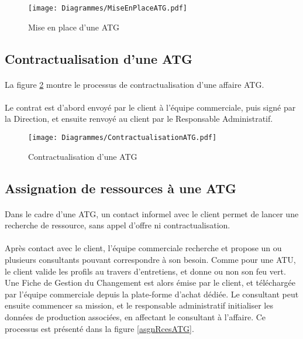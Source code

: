 \begin{figure}[H]
	\centering
	\texttt{[image: Diagrammes/MiseEnPlaceATG.pdf]}
	\caption{Mise en place d'une ATG} 
	\label{miseEnPlaceATG}
\end{figure}


\subsection{Contractualisation d'une ATG}
\label{subsection:contratATG}

\paragraph{} La figure \ref{contratATG} montre le processus de contractualisation d'une affaire ATG.
\paragraph{} Le contrat est d'abord envoyé par le client à l'équipe commerciale, puis signé par la Direction, et ensuite renvoyé au client par le Responsable Administratif. 


\begin{figure}[H]
	\centering
	\texttt{[image: Diagrammes/ContractualisationATG.pdf]}
	\caption{Contractualisation d'une ATG} 
	\label{contratATG}
\end{figure}



\subsection{Assignation de ressources à une ATG}

\paragraph{} Dans le cadre d'une ATG, un contact informel avec le client permet de lancer une recherche de ressource, sans appel d'offre ni contractualisation.
\paragraph{}Après contact avec le client, l'équipe commerciale recherche et propose un ou plusieurs consultants pouvant correspondre à son besoin. Comme pour une ATU, le client valide les profils au travers d'entretiens, et donne ou non son feu vert. Une Fiche de Gestion du Changement est alors émise par le client, et téléchargée par l'équipe commerciale depuis la plate-forme d'achat dédiée. Le consultant peut ensuite commencer sa mission, et le responsable administratif initialiser les données de production associées, en affectant le consultant à l'affaire.
Ce processus est présenté dans la figure \ref{asgnRcesATG}.

